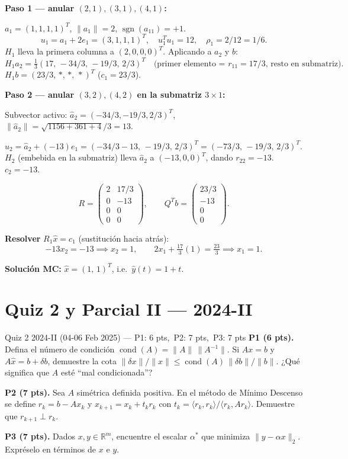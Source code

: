 \documentclass[11pt,a4paper]{article}
\begin{document}
\textbf{Paso 1 --- anular $(2,1),(3,1),(4,1)$:}

$a_1=(1,1,1,1)^T$, $\|a_1\|=2$, $\operatorname{sgn}(a_{11})=+1$.
\[
  u_1 = a_1 + 2e_1 = (3,1,1,1)^T, \quad u_1^Tu_1=12, \quad \rho_1 = 2/12 = 1/6.
\]
$H_1$ lleva la primera columna a $(2,0,0,0)^T$. Aplicando a $a_2$ y $b$:
\[
  H_1a_2 = \tfrac{1}{3}(17,\,-34/3,\,-19/3,\,2/3)^T
  \quad\text{(primer elemento = }r_{11}=17/3\text{, resto en submatriz)}.
\]
$H_1 b = (23/3,\,*,\,*,\,*)^T$ ($c_1=23/3$).

\textbf{Paso 2 --- anular $(3,2),(4,2)$ en la submatriz $3\times1$:}

Subvector activo: $\hat{a}_2 = (-34/3,-19/3,2/3)^T$, $\|\hat{a}_2\|=\sqrt{1156+361+4}/3=13$.

$u_2 = \hat{a}_2 + (-13)e_1 = (-34/3-13,\,-19/3,\,2/3)^T = (-73/3,\,-19/3,\,2/3)^T$.
$H_2$ (embebida en la submatriz) lleva $\hat{a}_2$ a $(-13,0,0)^T$, dando $r_{22}=-13$. $c_2=-13$.

\[
  R = \begin{pmatrix}2 & 17/3 \\ 0 & -13 \\ 0 & 0 \\ 0 & 0\end{pmatrix}, \qquad
  Q^Tb = \begin{pmatrix}23/3 \\ -13 \\ 0 \\ 0\end{pmatrix}.
\]

\textbf{Resolver} $R_1\hat{x}=c_1$ (sustitución hacia atrás):
\[
  -13x_2 = -13 \implies x_2=1, \qquad 2x_1 + \tfrac{17}{3}(1) = \tfrac{23}{3} \implies x_1=1.
\]
\begin{tcolorbox}[clave]
\textbf{Soluci\'on MC:} $\hat{x} = (1,\,1)^T$, i.e.\ $\hat{y}(t)=1+t$.
\end{tcolorbox}

\section{Quiz 2 y Parcial II --- 2024-II}

\begin{examen}{Quiz 2 2024-II (04-06 Feb 2025) --- P1: 6 pts,\ P2: 7 pts,\ P3: 7 pts}
\textbf{P1 (6 pts).} Defina el número de condición $\operatorname{cond}(A)=\|A\|\,\|A^{-1}\|$. Si $Ax=b$ y $A\hat x=b+\delta b$, demuestre la cota $\|\delta x\|/\|x\|\le\operatorname{cond}(A)\,\|\delta b\|/\|b\|$. ¿Qué significa que $A$ esté ``mal condicionada''?

\smallskip\textbf{P2 (7 pts).} Sea $A$ simétrica definida positiva. En el método de Mínimo Descenso se define $r_k=b-Ax_k$ y $x_{k+1}=x_k+t_kr_k$ con $t_k=\langle r_k,r_k\rangle/\langle r_k,Ar_k\rangle$. Demuestre que $r_{k+1}\perp r_k$.

\smallskip\textbf{P3 (7 pts).} Dados $x,y\in\mathbb{R}^m$, encuentre el escalar $\alpha^*$ que minimiza $\|y-\alpha x\|_2$. Expréselo en términos de $x$ e $y$.
\end{examen}
\end{document}
